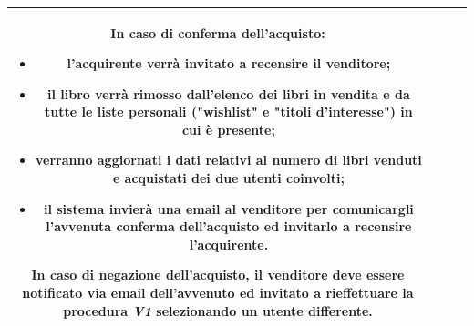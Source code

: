 \documentclass[10pt,a4paper]{report}
\begin{document}
\begin{tabular}{cp{3cm}p{9cm}p{1cm}}
		In caso di conferma dell'acquisto:
		\begin{itemize}
			\item l'acquirente verrà invitato a recensire il venditore;
			\item il libro verrà rimosso dall'elenco dei libri in vendita e da tutte le liste personali ("wishlist" e "titoli d'interesse") in cui è presente;
			\item verranno aggiornati i dati relativi al numero di libri venduti e acquistati dei due utenti coinvolti;
			\item il sistema invierà una email al venditore per comunicargli l'avvenuta conferma dell'acquisto ed invitarlo a recensire l'acquirente.
		\end{itemize}
		In caso di negazione dell'acquisto, il venditore deve essere notificato via email dell'avvenuto ed invitato a rieffettuare la procedura \textit{V1} selezionando un utente differente. \\ \hline
	\end{tabular}
\end{document}
